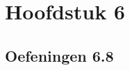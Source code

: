 \documentclass[lineaire_algebra_oplossingen.tex]{subfiles}
\begin{document}
\chapter{Hoofdstuk 6}
\section{Oefeningen 6.8}
\end{document}
